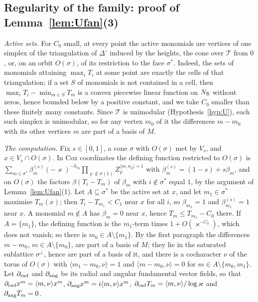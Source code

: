 \subsection{Regularity of the family: proof of Lemma~\ref{lem:Ufan}(3)}\label{app:Ufan}
\emph{Active sets.} For $C_0$ small, at every point the active monomials are vertices of one simplex of the triangulation of $\Delta^\circ$ induced by the heights, the cone over $\mathcal T$ from $0$, or, on an orbit $O(\sigma)$, of its restriction to the face $\sigma^*$. Indeed, the sets of monomials attaining $\max_iT_i$ at some point are exactly the cells of that triangulation; if a set $S$ of monomials is not contained in a cell, then $\max_iT_i-\min_{m\in S}T_m$ is a convex piecewise linear function on $N_\mathbb R$ without zeros, hence bounded below by a positive constant, and we take $C_0$ smaller than these finitely many constants. Since $\mathcal T$ is unimodular (Hypothesis~\ref{hyp:U}), each such simplex is unimodular, so for any vertex $m_0$ of it the differences $m-m_0$ with its other vertices $m$ are part of a basis of $M$.

\emph{The computation.} Fix $s\in[0,1]$, a cone $\sigma$ with $O(\sigma)$ met by $V_s$, and $x\in V_s\cap O(\sigma)$. In Cox coordinates the defining function restricted to $O(\sigma)$ is $\sum_{m\in\sigma^*}\beta^{(s)}_m(-\varkappa)^{-\check h_m}\prod_{\varrho\notin\sigma(1)}Z_\varrho^{\langle m,n_\varrho\rangle+1}$ with $\beta^{(s)}_m=(1-s)+s\beta_m$, and on $O(\sigma)$ the factors $\beta(T_i-T_m)$ of $\beta_m$ with $i\notin\sigma^*$ equal $1$, by the argument of Lemma~\ref{lem:Ufan}(1). Let $A\subseteq\sigma^*$ be the active set at $x$, and let $m_1\in\sigma^*$ maximise $T_m(x)$; then $T_i-T_{m_1}<C_1$ near $x$ for all $i$, so $\beta_{m_1}=1$ and $\beta^{(s)}_{m_1}=1$ near $x$. A monomial $m\notin A$ has $\beta_m=0$ near $x$, hence $T_m\le T_{m_1}-C_0$ there. If $A=\{m_1\}$, the defining function is the $m_1$-term times $1+O(\varkappa^{-C_0})$, which does not vanish; so there is $m_0\in A\setminus\{m_1\}$. By the first paragraph the differences $m-m_0$, $m\in A\setminus\{m_0\}$, are part of a basis of $M$; they lie in the saturated sublattice $\sigma^\perp$, hence are part of a basis of it, and there is a cocharacter $\nu$ of the torus of $O(\sigma)$ with $\langle m_1-m_0,\nu\rangle=1$ and $\langle m-m_0,\nu\rangle=0$ for $m\in A\setminus\{m_0,m_1\}$. Let $\partial_{\rm rad}$ and $\partial_{\rm ang}$ be its radial and angular fundamental vector fields, so that $\partial_{\rm rad}x^m=\langle m,\nu\rangle x^m$, $\partial_{\rm ang} x^m=i\langle m,\nu\rangle x^m$, $\partial_{\rm rad}T_m=\langle m,\nu\rangle/\log \varkappa$ and $\partial_{\rm ang} T_m=0$.

